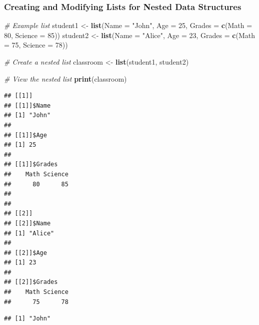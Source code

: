 \documentclass[
]{book}
\newenvironment{Shaded}{\begin{snugshade}}{\end{snugshade}}
\newcommand{\AttributeTok}[1]{\textcolor[rgb]{0.13,0.29,0.53}{#1}}
\newcommand{\CommentTok}[1]{\textcolor[rgb]{0.56,0.35,0.01}{\textit{#1}}}
\newcommand{\DecValTok}[1]{\textcolor[rgb]{0.00,0.00,0.81}{#1}}
\newcommand{\FunctionTok}[1]{\textcolor[rgb]{0.13,0.29,0.53}{\textbf{#1}}}
\newcommand{\NormalTok}[1]{#1}
\newcommand{\OtherTok}[1]{\textcolor[rgb]{0.56,0.35,0.01}{#1}}
\newcommand{\SpecialCharTok}[1]{\textcolor[rgb]{0.81,0.36,0.00}{\textbf{#1}}}
\newcommand{\StringTok}[1]{\textcolor[rgb]{0.31,0.60,0.02}{#1}}
\begin{document}
\subsubsection{Creating and Modifying Lists for Nested Data Structures}\label{creating-and-modifying-lists-for-nested-data-structures}

\begin{Shaded}
\begin{Highlighting}[]
\CommentTok{\# Example list}
\NormalTok{student1 }\OtherTok{\textless{}{-}} \FunctionTok{list}\NormalTok{(}\AttributeTok{Name =} \StringTok{"John"}\NormalTok{, }\AttributeTok{Age =} \DecValTok{25}\NormalTok{, }\AttributeTok{Grades =} \FunctionTok{c}\NormalTok{(}\AttributeTok{Math =} \DecValTok{80}\NormalTok{, }\AttributeTok{Science =} \DecValTok{85}\NormalTok{))}
\NormalTok{student2 }\OtherTok{\textless{}{-}} \FunctionTok{list}\NormalTok{(}\AttributeTok{Name =} \StringTok{"Alice"}\NormalTok{, }\AttributeTok{Age =} \DecValTok{23}\NormalTok{, }\AttributeTok{Grades =} \FunctionTok{c}\NormalTok{(}\AttributeTok{Math =} \DecValTok{75}\NormalTok{, }\AttributeTok{Science =} \DecValTok{78}\NormalTok{))}

\CommentTok{\# Create a nested list}
\NormalTok{classroom }\OtherTok{\textless{}{-}} \FunctionTok{list}\NormalTok{(student1, student2)}

\CommentTok{\# View the nested list}
\FunctionTok{print}\NormalTok{(classroom)}
\end{Highlighting}
\end{Shaded}

\begin{verbatim}
## [[1]]
## [[1]]$Name
## [1] "John"
## 
## [[1]]$Age
## [1] 25
## 
## [[1]]$Grades
##    Math Science 
##      80      85 
## 
## 
## [[2]]
## [[2]]$Name
## [1] "Alice"
## 
## [[2]]$Age
## [1] 23
## 
## [[2]]$Grades
##    Math Science 
##      75      78
\end{verbatim}

\begin{Shaded}
\end{Shaded}

\begin{verbatim}
## [1] "John"
\end{verbatim}
\end{document}
